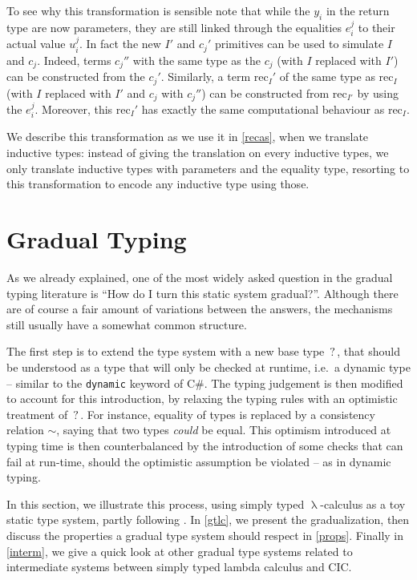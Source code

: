 \documentclass{kaobook}
\renewcommand{\mathtt}{\mathrm}
\newcommand{\cons}{\sim}
\DeclareMathOperator{\?}{?}
\renewcommand{\l}{\operatorname{\lambda}}
\newcommand{\rec}{\mathtt{rec}}
\begin{document}
{To see why this transformation is sensible note that while the $y_i$ in the return type are now parameters, they are still linked through the equalities $e_i^j$ to their actual value $u_i^j$.
In fact the new $I'$ and $c_j'$ primitives can be used to simulate $I$ and $c_j$.  Indeed, terms $c_j''$ with the same type as the $c_j$ (with $I$ replaced with $I'$) can be constructed from the $c_j'$. Similarly, a term $\rec_I'$ of the same type as $\rec_I$ (with $I$ replaced with $I'$ and $c_j$ with $c_j''$) can be constructed from $\rec_{I'}$ by using the $e_i^j$. Moreover, this $\rec_I'$ has exactly the same computational behaviour as $\rec_I$.

We describe this transformation as we use it in \autoref{recas}, when we translate inductive types: instead of giving the translation on every inductive types, we only translate inductive types with parameters and the equality type, resorting to this transformation to encode any inductive type using those.

\section{Gradual Typing}
\label{GT}

As we already explained, one of the most widely asked question in the gradual typing literature is “How do I turn this static system gradual?”. Although there are of course a fair amount of variations between the answers, the mechanisms still usually have a somewhat common structure.

The first step is to extend the type system with a new base type $\?$, that should be understood as a type that will only be checked at runtime, i.e.\ a dynamic type – similar to the \texttt{dynamic} keyword of C\#. The typing judgement is then modified to account for this introduction, by relaxing the typing rules with an optimistic treatment of $\?$. For instance, equality of types is replaced by a consistency relation $\cons$, saying that two types \emph{could} be equal. This optimism introduced at typing time is then counterbalanced by the introduction of some checks that can fail at run-time, should the optimistic assumption be violated – as in dynamic typing.

In this section, we illustrate this process, using simply typed $\l$-calculus as a toy static type system, partly following \cite{Siek2015}. In \autoref{gtlc}, we present the gradualization, then discuss the properties a gradual type system should respect in \autoref{props}. Finally in \autoref{interm}, we give a quick look at other gradual type systems related to intermediate systems between simply typed lambda calculus and CIC.

}
\end{document}
